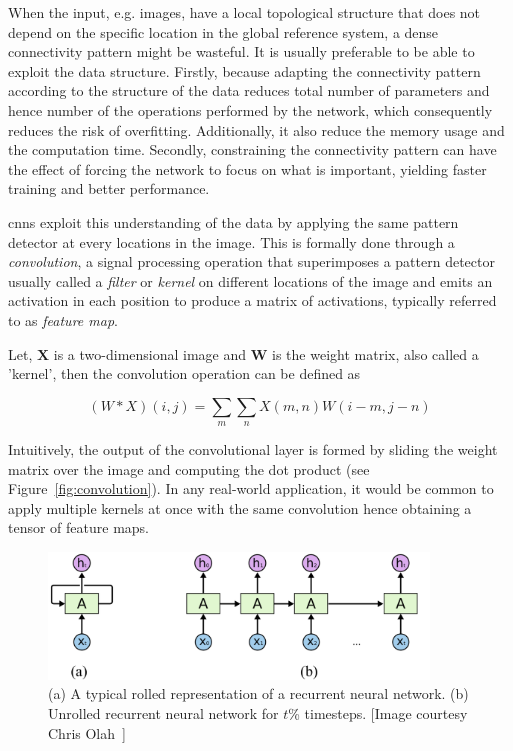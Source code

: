 When the input, e.g. images, have a local topological structure that does not depend on the specific location in the global reference system, a dense connectivity pattern might be wasteful. It is usually preferable to be able to exploit the data structure. Firstly, because adapting the connectivity pattern according to the structure of the data reduces total number of parameters and hence number of the  operations performed by the network, which consequently reduces the risk of overfitting. Additionally, it also reduce the memory usage and the computation time. Secondly, constraining the connectivity pattern can have the effect of forcing the network to focus on what is important, yielding faster training and better performance.

\gls{cnn}s exploit this understanding of the data by applying the same pattern detector at every locations in the image. This is formally done through a \textit{convolution}, a signal processing operation that superimposes a pattern detector usually called a \textit{filter} or \textit{kernel} on different locations of the image and emits an activation in each position to produce a matrix of activations, typically referred to as \textit{feature map}. 

Let, $\mathbf{X}$ is a two-dimensional image and $\mathbf{W}$ is the weight matrix, also called a ’kernel’, then the convolution operation can be defined as 

\begin{equation}
(W \ast X)(i, j) = \sum_{m}\sum_{n} X(m, n) W (i - m, j - n)
\end{equation}

Intuitively, the output of the convolutional layer is formed by sliding the weight matrix over the image and computing the dot product (see Figure~\ref{fig:convolution}). In any real-world application, it would be common to apply multiple kernels at once with the same convolution hence obtaining a tensor of feature maps.

\begin{figure}
	\centering
	\includegraphics[width=0.9\textwidth]{figures/RNN_unrolled.pdf}
	\caption[A typical rolled representation of a recurrent neural network]
	{(a) A typical rolled representation of a recurrent neural network. (b) Unrolled recurrent neural network for $t$\% timesteps. [Image courtesy Chris Olah~\cite{colah_15}]\label{fig:RNN_unrolled}}
\end{figure}




